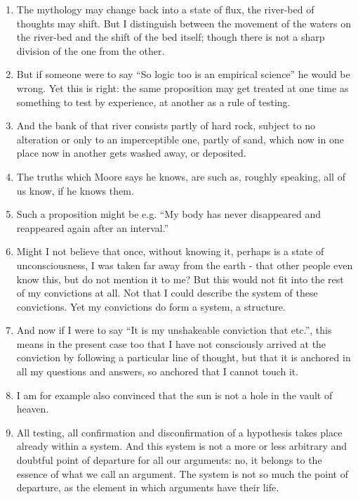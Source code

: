 \documentclass{book}
\begin{document}
\begin{enumerate}
\item
The mythology may change back into a state of flux, the river-bed of thoughts
may shift. But I distinguish between the movement of the waters on the
river-bed and the shift of the bed itself; though there is not a sharp division
of the one from the other.

\item
But if someone were to say ``So logic too is an empirical science'' he would be
wrong. Yet this is right: the same proposition may get treated at one time as
something to test by experience, at another as a rule of testing.

\item
And the bank of that river consists partly of hard rock, subject to no
alteration or only to an imperceptible one, partly of sand, which now in one
place now in another gets washed away, or deposited.

\item
The truths which Moore says he knows, are such as, roughly speaking, all of us
know, if he knows them.

\item
Such a proposition might be e.g. ``My body has never disappeared and reappeared
again after an interval.''

\item
Might I not believe that once, without knowing it, perhaps is a state of
unconsciousness, I was taken far away from the earth - that other people even
know this, but do not mention it to me? But this would not fit into the rest of
my convictions at all. Not that I could describe the system of these
convictions. Yet my convictions do form a system, a structure.

\item
And now if I were to say ``It is my unshakeable conviction that etc.'', this
means in the present case too that I have not consciously arrived at the
conviction by following a particular line of thought, but that it is anchored
in all my questions and answers, so anchored that I cannot touch it.

\item
I am for example also convinced that the sun is not a hole in the vault of
heaven.

\item
All testing, all confirmation and disconfirmation of a hypothesis takes place
already within a system. And this system is not a more or less arbitrary and
doubtful point of departure for all our arguments: no, it belongs to the
essence of what we call an argument. The system is not so much the point of
departure, as the element in which arguments have their life.


\end{enumerate}
\end{document}
